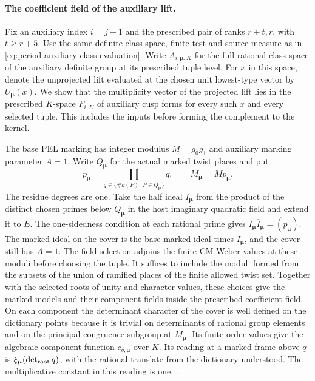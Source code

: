 \paragraph{The coefficient field of the auxiliary lift.}
Fix an auxiliary index \(i=j-1\) and the prescribed pair of
ranks \(r+t,r\), with \(t\ge r+5\). Use the same definite
class space, finite test and source measure as in
\eqref{eq:period-auxiliary-class-evaluation}. Write
\(A_{i,\boldsymbol\mu,K}\) for the full rational class space
of the auxiliary definite group at its prescribed tuple level.
For \(x\) in this space, denote the unprojected lift evaluated
at the chosen unit lowest-type vector by \(U_{\boldsymbol\mu}(x)\).
We show that the multiplicity vector of the projected lift
lies in the prescribed \(K\)-space \(F_{i,K}\) of auxiliary cusp forms for every such
\(x\) and every selected tuple. This includes the inputs before
forming the complement to the kernel.

The base PEL marking has integer modulus \(M=g_0g_1\) and
auxiliary marking parameter \(A=1\). Write \(Q_{\boldsymbol\mu}\)
for the actual marked twist places and put
\[
 p_{\boldsymbol\mu}=\prod_{q\in\{\# k(P):\,P\in Q_{\boldsymbol\mu}\}}q,
 \qquad M_{\boldsymbol\mu}=M p_{\boldsymbol\mu}.
\]
The residue degrees are one. Take the half ideal
\(I_{\boldsymbol\mu}\) from the product of the distinct chosen
primes below \(Q_{\boldsymbol\mu}\) in the host imaginary
quadratic field and extend it to \(E\). The one-sidedness
condition at each rational prime gives
\(I_{\boldsymbol\mu}\overline{I}_{\boldsymbol\mu}=(p_{\boldsymbol\mu})\).
The marked ideal on the cover is the base marked ideal times
\(I_{\boldsymbol\mu}\), and the cover still has \(A=1\).
The field selection adjoins the finite CM Weber values at these
moduli before choosing the tuple. It suffices to include the
moduli formed from the subsets of the union of ramified places
of the finite allowed twist set. Together with the selected
roots of unity and character values, these choices give the
marked models and their component fields inside the prescribed
coefficient field. On each component the determinant character
of the cover is well defined on the dictionary points because
it is trivial on determinants of rational group elements and on the principal
congruence subgroup at \(M_{\boldsymbol\mu}\). Its finite-order
values give the algebraic component function \(c_{\delta,\boldsymbol\mu}\)
over \(K\). Its reading at a marked frame above \(q\) is
\(\xi_{\boldsymbol\mu}(\det_{\rm root} q)\), with the rational
translate from the dictionary understood. The multiplicative
constant in this reading is one.
.

